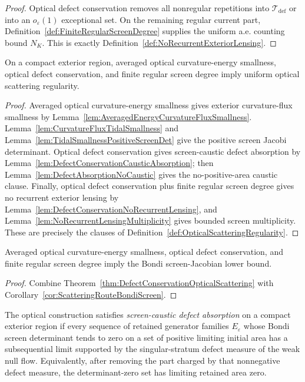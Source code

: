 \begin{proof}
Optical defect conservation removes all nonregular repetitions into $\mathcal T_{\mathrm{def}}$ or into an $o_\varepsilon(1)$ exceptional set. On the remaining regular current part, Definition~\ref{def:FiniteRegularScreenDegree} supplies the uniform a.e. counting bound $N_K$. This is exactly Definition~\ref{def:NoRecurrentExteriorLensing}.
\end{proof}

\begin{theorem}\label{thm:DefectConservationOpticalScattering}
On a compact exterior region, averaged optical curvature-energy smallness, optical defect conservation, and finite regular screen degree imply uniform optical scattering regularity.
\end{theorem}

\begin{proof}
Averaged optical curvature-energy smallness gives exterior curvature-flux smallness by Lemma~\ref{lem:AveragedEnergyCurvatureFluxSmallness}. Lemma~\ref{lem:CurvatureFluxTidalSmallness} and Lemma~\ref{lem:TidalSmallnessPositiveScreenDet} give the positive screen Jacobi determinant. Optical defect conservation gives screen-caustic defect absorption by Lemma~\ref{lem:DefectConservationCausticAbsorption}; then Lemma~\ref{lem:DefectAbsorptionNoCaustic} gives the no-positive-area caustic clause. Finally, optical defect conservation plus finite regular screen degree gives no recurrent exterior lensing by Lemma~\ref{lem:DefectConservationNoRecurrentLensing}, and Lemma~\ref{lem:NoRecurrentLensingMultiplicity} gives bounded screen multiplicity. These are precisely the clauses of Definition~\ref{def:OpticalScatteringRegularity}.
\end{proof}

\begin{corollary}\label{cor:DefectConservationBondiScreen}
Averaged optical curvature-energy smallness, optical defect conservation, and finite regular screen degree imply the Bondi screen-Jacobian lower bound.
\end{corollary}

\begin{proof}
Combine Theorem~\ref{thm:DefectConservationOpticalScattering} with Corollary~\ref{cor:ScatteringRouteBondiScreen}.
\end{proof}

\begin{definition}\label{def:ScreenCausticDefectAbsorption}
The optical construction satisfies \emph{screen-caustic defect absorption} on a compact exterior region if every sequence of retained generator families $E_\varepsilon$ whose Bondi screen determinant tends to zero on a set of positive limiting initial area has a subsequential limit supported by the singular-stratum defect measure of the weak null flow. Equivalently, after removing the part charged by that nonnegative defect measure, the determinant-zero set has limiting retained area zero.
\end{definition}

